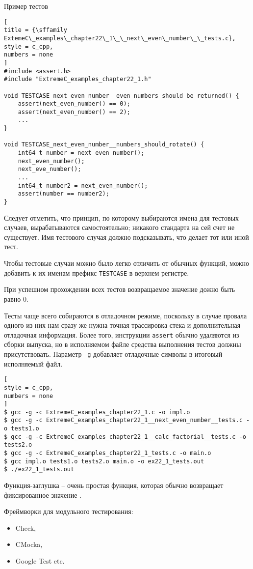 \documentclass[%
	11pt,
	a4paper,
	utf8,
		]{article}
\begin{document}
Пример тестов
\begin{lstlisting}[
title = {\sffamily ExtemeC\_examples\_chapter22\_1\_\_next\_even\_number\_\_tests.c},
style = c_cpp,
numbers = none
]
#include <assert.h>
#include "ExtremeC_examples_chapter22_1.h"

void TESTCASE_next_even_number__even_numbers_should_be_returned() {
    assert(next_even_number() == 0);
    assert(next_even_number() == 2);
    ...
}

void TESTCASE_next_even_number__numbers_should_rotate() {
    int64_t number = next_even_number();
    next_even_number();
    next_eve_number();
    ...
    int64_t number2 = next_even_number();
    assert(number == number2);
}
\end{lstlisting}

Следует отметить, что принцип, по которому выбираются имена для тестовых случаев, вырабатываются самостоятельно; никакого стандарта на сей счет не существует. Имя тестового случая должно подсказывать, что делает тот или иной тест. 

Чтобы тестовые случаи можно было легко отличить от обычных функций, можно добавить к их именам префикс \verb|TESTCASE| в верхнем регистре.

При успешном прохождении всех тестов возвращаемое значение дожно быть равно 0.

Тесты чаще всего собираются в отладочном режиме, поскольку в случае провала одного из них нам сразу же нужна точная трассировка стека и дополнительная отладочная информация. Более того, инструкции \verb|assert| обычно удаляются из сборки выпуска, но в исполняемом файле средства выполнения тестов должны присутствовать. Параметр \verb|-g| добавляет отладочные символы в итоговый исполняемый файл.
\begin{lstlisting}[
style = c_cpp,
numbers = none
]
$ gcc -g -c ExtremeC_examples_chapter22_1.c -o impl.o
$ gcc -g -c ExtremeC_examples_chapter22_1__next_even_number__tests.c -o tests1.o
$ gcc -g -c ExtremeC_examples_chapter22_1__calc_factorial__tests.c -o tests2.o
$ gcc -g -c ExtremeC_examples_chapter22_1_tests.c -o main.o
$ gcc impl.o tests1.o tests2.o main.o -o ex22_1_tests.out
$ ./ex22_1_tests.out
\end{lstlisting}

Функция-заглушка -- очень простая функция, которая обычно возвращает фиксированное значение \cite[]{amini-extreme-c:2022}.

Фреймворки для модульного тестирования:
\begin{itemize}
	\item Check,
	
	\item CMocka,
	
	\item Google Test etc.
\end{itemize}
\end{document}
